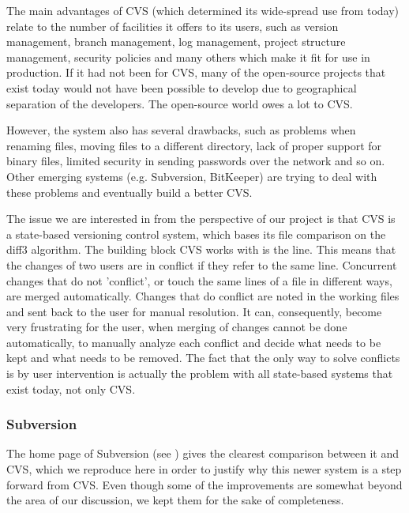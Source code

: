 The main advantages of CVS (which determined its wide-spread use from today) relate to the number of
facilities it offers to its users, such as version management, branch management, log management, project
structure management, security policies and many others which make it fit for use in production.
If it had not been for CVS, many of the open-source projects that exist today would not have been
possible to develop due to geographical separation of the developers. The open-source world owes
a lot to CVS.

However, the system also has several drawbacks, such as problems when renaming files, moving files to
a different directory, lack of proper support for binary files, limited security in sending passwords over the
network and so on. Other emerging systems (e.g. Subversion, BitKeeper) are trying to deal with these
problems and eventually build a better CVS.

The issue we are interested in from the perspective of our project is that CVS is a state-based versioning
control system, which bases its file comparison on the diff3 algorithm. The building block CVS works
with is the line. This means that the changes of two users are in conflict if they refer to the same
line. Concurrent changes that do not 'conflict', or touch the same lines of a file in different ways,
are merged automatically. Changes that do conflict are noted in the working files and sent back to the
user for manual resolution. It can, consequently, become very frustrating for the user, when merging
of changes cannot be done automatically, to manually analyze each conflict and decide what needs to
be kept and what needs to be removed. The fact that the only way to solve conflicts is by user
intervention is actually the problem with all state-based systems that exist today, not only CVS.

\subsubsection{Subversion}

The home page of Subversion (see \cite{subv}) gives the clearest comparison between it and CVS, which we
reproduce here in order to justify why this newer system is a step forward from CVS. Even though some
of the improvements are somewhat beyond the area of our discussion, we kept them for the sake of
completeness.

